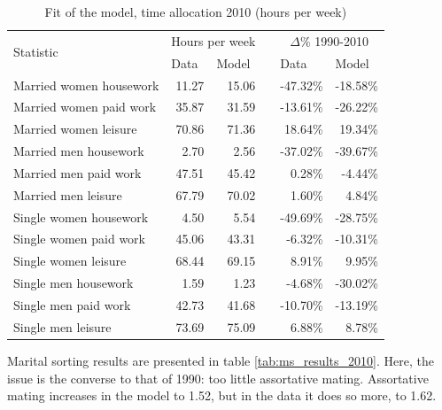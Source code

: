 \documentclass[12pt]{article}
\begin{document}
\begin{table}[htbp]
	\centering
	\caption{Fit of the model, time allocation 2010 (hours per week)}
	\begin{tabular}{lrrrrr}
		\toprule
		\multirow{2}[4]{*}{Statistic} & \multicolumn{2}{c}{Hours per week} &       & \multicolumn{2}{c}{$\Delta$\% 1990-2010} \\
		\cmidrule{2-3}\cmidrule{5-6}      & \multicolumn{1}{l}{Data} & \multicolumn{1}{l}{Model} &       & \multicolumn{1}{l}{Data} & \multicolumn{1}{l}{Model} \\
		\midrule
		Married women housework & 11.27 & 15.06 &       & -47.32\% & -18.58\% \\
		Married women paid work & 35.87 & 31.59 &       & -13.61\% & -26.22\% \\
		Married women leisure & 70.86 & 71.36 &       & 18.64\% & 19.34\% \\
		Married men housework & 2.70  & 2.56  &       & -37.02\% & -39.67\% \\
		Married men paid work & 47.51 & 45.42 &       & 0.28\% & -4.44\% \\
		Married men leisure & 67.79 & 70.02 &       & 1.60\% & 4.84\% \\
		Single women housework & 4.50  & 5.54  &       & -49.69\% & -28.75\% \\
		Single women paid work & 45.06 & 43.31 &       & -6.32\% & -10.31\% \\
		Single women leisure & 68.44 & 69.15 &       & 8.91\% & 9.95\% \\
		Single men housework & 1.59  & 1.23  &       & -4.68\% & -30.02\% \\
		Single men paid work & 42.73 & 41.68 &       & -10.70\% & -13.19\% \\
		Single men leisure & 73.69 & 75.09 &       & 6.88\% & 8.78\% \\
		\bottomrule
		\bottomrule
	\end{tabular}
	\label{tab:ta_results_2010}
\end{table}

Marital sorting results are presented in table \ref{tab:ms_results_2010}. Here, the issue is the converse to that of 1990: too little assortative mating. Assortative mating increases in the model to 1.52, but in the data it does so more, to 1.62. 
\end{document}
